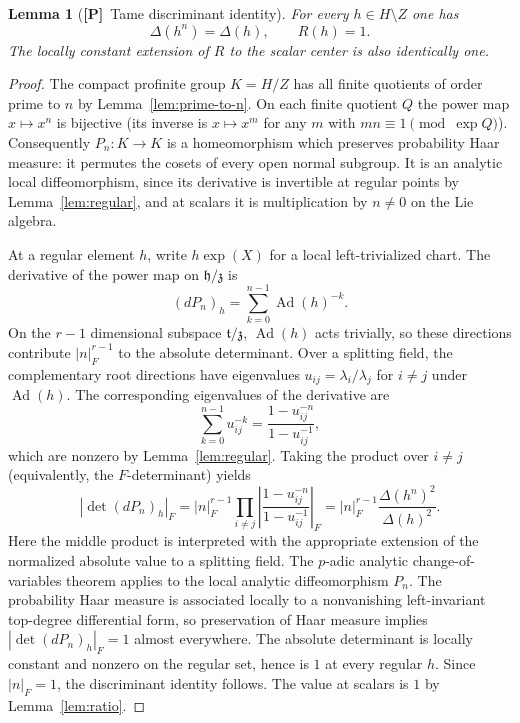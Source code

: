 \documentclass[11pt]{article}
\newcommand{\Ptag}{\textnormal{\textbf{[P]}}}
\theoremstyle{plain}
\newtheorem{lemma}[theorem]{Lemma}
\theoremstyle{definition}
\begin{document}
\begin{lemma}[\Ptag\ Tame discriminant identity]\label{lem:tame-R}
For every $h\in H\setminus Z$ one has
\[
\boxed{\;\Delta(h^n)=\Delta(h),\qquad R(h)=1.\;}
\]
The locally constant extension of $R$ to the scalar center is also
identically one.
\end{lemma}
\begin{proof}
The compact profinite group $K=H/Z$ has all finite quotients of
order prime to $n$ by Lemma~\ref{lem:prime-to-n}. On each finite
quotient $Q$ the power map $x\mapsto x^n$ is bijective (its inverse
is $x\mapsto x^m$ for any $m$ with $mn\equiv1\pmod{\exp Q}$).
Consequently $P_n:K\to K$ is a homeomorphism which preserves
probability Haar measure: it permutes the cosets of every open
normal subgroup. It is an analytic local diffeomorphism, since
its derivative is invertible at regular points by
Lemma~\ref{lem:regular}, and at scalars it is multiplication by
$n\ne0$ on the Lie algebra.

At a regular element $h$, write $h\exp(X)$ for a local
left-trivialized chart. The derivative of the power map on
$\mathfrak h/\mathfrak z$ is
\[
(dP_n)_h=\sum_{k=0}^{n-1}\operatorname{Ad}(h)^{-k}.
\]
On the $r-1$ dimensional subspace $\mathfrak t/\mathfrak z$,
$\operatorname{Ad}(h)$ acts trivially, so these directions contribute
$|n|_F^{r-1}$ to the absolute determinant. Over a splitting field,
the complementary root directions have eigenvalues
$u_{ij}=\lambda_i/\lambda_j$ for $i\ne j$ under
$\operatorname{Ad}(h)$. The corresponding eigenvalues of the
derivative are
\[
\sum_{k=0}^{n-1}u_{ij}^{-k}
=\frac{1-u_{ij}^{-n}}{1-u_{ij}^{-1}},
\]
which are nonzero by Lemma~\ref{lem:regular}. Taking the product
over $i\ne j$ (equivalently, the $F$-determinant) yields
\[
|\det(dP_n)_h|_F
=|n|_F^{r-1}\prod_{i\ne j}
  \left|\frac{1-u_{ij}^{-n}}{1-u_{ij}^{-1}}\right|_F
=|n|_F^{r-1}\frac{\Delta(h^n)^2}{\Delta(h)^2}.
\]
Here the middle product is interpreted with the appropriate
extension of the normalized absolute value to a splitting field.
The $p$-adic analytic change-of-variables theorem
\cite[Proposition~1.2.1]{Loeser} applies to the local analytic
diffeomorphism $P_n$. The probability Haar measure is associated
locally to a nonvanishing left-invariant top-degree differential
form, so preservation of Haar measure implies
$|\det(dP_n)_h|_F=1$ almost everywhere. The absolute determinant
is locally constant and nonzero on the regular set, hence is $1$
at every regular $h$. Since $|n|_F=1$, the discriminant identity
follows. The value at scalars is $1$ by Lemma~\ref{lem:ratio}.
\end{proof}
\end{document}
